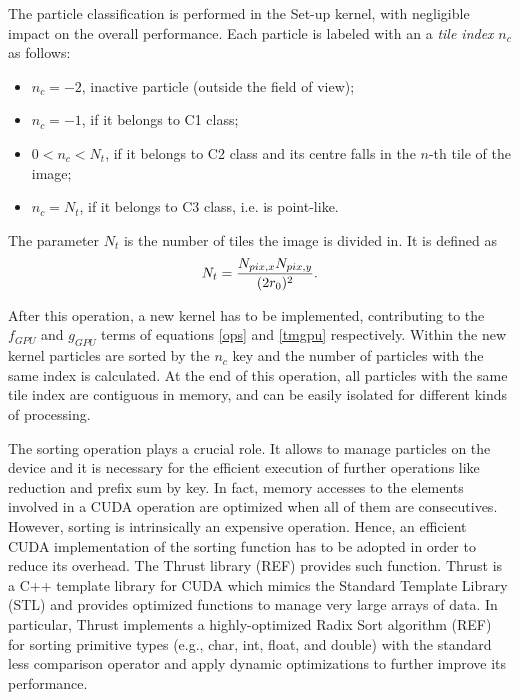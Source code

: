 \documentclass[11pt]{article}
\begin{document}
The particle classification is performed in the Set-up kernel, with negligible impact
on the overall performance. Each particle is labeled
with an a {\it tile index} $n_c$ as follows:
\begin{itemize}
\item 
$n_c = -2$, inactive particle (outside the field of view);
\item
$n_c = -1$, if it belongs to C1 class; 
\item
$0 < n_c < N_t$, if it belongs to C2 class and its centre falls in the $n$-th tile of the image;  
\item
$n_c = N_t$, if it belongs to C3 class, i.e. is point-like.
\end{itemize}
The parameter $N_t$ is the number of tiles the image is divided in. It is defined as
\begin{equation}
N_t = {N_{pix,x} N_{pix,y}\over (2r_0)^2}.   
\end{equation}

After this operation, a new kernel has to be implemented, contributing to the $f_{GPU}$
and $g_{GPU}$ terms of equations \eqref{ops} and \eqref{tmgpu} respectively. 
Within the new kernel particles are sorted by the $n_c$ key and the number 
of particles with the same index is calculated. At the end of this operation, 
all particles with the same tile index are contiguous in memory, and can be easily 
isolated for different kinds of processing. 

The sorting operation plays a crucial role. It allows to manage particles on the 
device and it is necessary for the efficient execution of further operations like 
reduction and prefix sum by key. In fact, memory accesses to the elements involved 
in a CUDA operation are optimized when all of them are consecutives. However, sorting 
is intrinsically an expensive operation. Hence, an efficient CUDA implementation of
the sorting function has to be adopted in order to reduce its overhead. 
The Thrust library (REF) provides such function. Thrust is a C++ template library 
for CUDA which mimics the Standard Template Library (STL) and provides 
optimized functions to manage very large arrays of data. In particular, Thrust 
implements a highly-optimized Radix Sort algorithm (REF) for sorting primitive types
(e.g., char, int, float, and double) with the standard less comparison operator and 
apply dynamic optimizations to further improve its performance.
\end{document}
